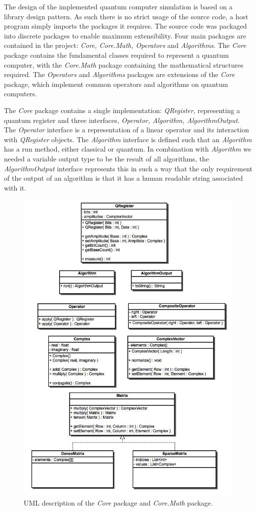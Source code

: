 The design of the implemented quantum computer simulation is based on a library design pattern. As such there is no strict usage of the source code, a host program simply imports the packages it requires. The source code was packaged into discrete packages to enable maximum extensibility. Four main packages are contained in the project: \emph{Core, Core.Math, Operators} and \emph{Algorithms}. The \emph{Core} package contains the fundamental classes required to represent a quantum computer, with the \emph{Core.Math} package containing the mathematical structures required. The \emph{Operators} and \emph{Algorithms} packages are extensions of the \emph{Core} package, which implement common operators and algorithms on quantum computers.

The \emph{Core} package contains a single implementation: \emph{QRegister}, representing a quantum register and three interfaces, \emph{Operator, Algorithm, AlgorithmOutput}. The \emph{Operator} interface is a representation of a linear operator and its interaction with \emph{QRegister} objects. The \emph{Algorithm} interface is defined such that an \emph{Algorithm} has a run method, either classical or quantum. In combination with \emph{Algorithm} we needed a variable output type to be the result of all algorithms, the \emph{AlgorithmOutput} interface represents this in such a way that the only requirement of the output of an algorithm is that it has a human readable string associated with it.

\begin{figure}[H]
	\centering
	\includegraphics[width=140mm]{./images/design}
	\caption{UML description of the \emph{Core} package and \emph{Core.Math} package.}
\end{figure}